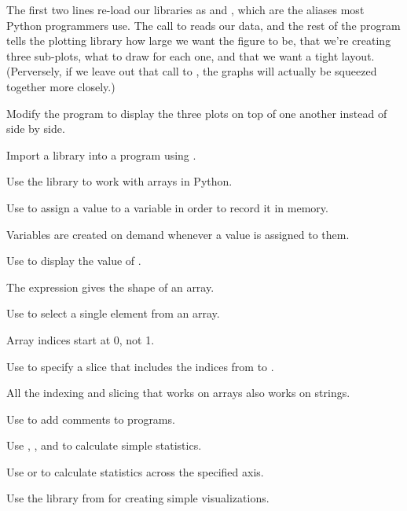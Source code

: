 
The first two lines re-load our libraries as  and
, which are the aliases most Python programmers use. The
call to  reads our data, and the rest of the program
tells the plotting library how large we want the figure to be, that
we're creating three sub-plots, what to draw for each one, and that we
want a tight layout. (Perversely, if we leave out that call to
, the graphs will actually be squeezed
together more closely.)

\begin{challenge}
  Modify the program to display the three plots on top of one another
  instead of side by side.
\end{challenge}

\begin{keypoints}
\begin{swcitemize}
\item
  Import a library into a program using .
\item
  Use the  library to work with arrays in Python.
\item
  Use  to assign a value to a variable in order
  to record it in memory.
\item
  Variables are created on demand whenever a value is assigned to them.
\item
  Use  to display the value of
  .
\item
  The expression  gives the shape of an array.
\item
  Use  to select a single element from an array.
\item
  Array indices start at 0, not 1.
\item
  Use  to specify a slice that includes the indices
  from  to .
\item
  All the indexing and slicing that works on arrays also works on
  strings.
\item
  Use  to add comments to programs.
\item
  Use , , and
   to calculate simple statistics.
\item
  Use  or  to
  calculate statistics across the specified axis.
\item
  Use the  library from  for creating
  simple visualizations.
\end{swcitemize}
\end{keypoints}

